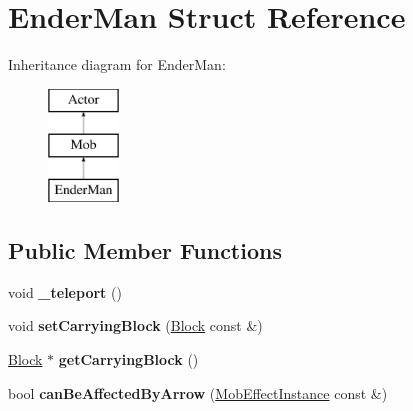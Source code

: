 \hypertarget{struct_ender_man}{}\section{Ender\+Man Struct Reference}
\label{struct_ender_man}
Inheritance diagram for Ender\+Man\+:\begin{figure}[H]
\begin{center}
\leavevmode
\includegraphics[height=3.000000cm]{struct_ender_man}
\end{center}
\end{figure}
\subsection*{Public Member Functions}
\begin{DoxyCompactItemize}
\item 
\mbox{\label{struct_ender_man_ac70396649f8bff5337887ac0236eef79}} 
void {\bfseries \+\_\+teleport} ()
\item 
\mbox{\label{struct_ender_man_a7900c09c51725e424e114fb640ced3d2}} 
void {\bfseries set\+Carrying\+Block} (\mbox{\hyperlink{struct_block}{Block}} const \&)
\item 
\mbox{\label{struct_ender_man_a4e6d2f7dc0551858a4ce34fa2cd6bfec}} 
\mbox{\hyperlink{struct_block}{Block}} $\ast$ {\bfseries get\+Carrying\+Block} ()
\item 
\mbox{\label{struct_ender_man_a30e7d61c70f3ef361446af727b61015a}} 
bool {\bfseries can\+Be\+Affected\+By\+Arrow} (\mbox{\hyperlink{struct_mob_effect_instance}{Mob\+Effect\+Instance}} const \&)
\end{DoxyCompactItemize}
